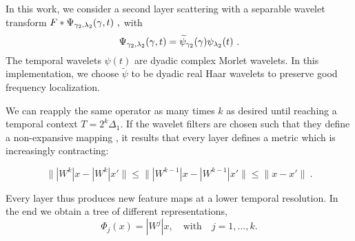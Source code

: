 In this work, we consider a second layer scattering with 
a separable wavelet transform $F \ast \Psi_{\gamma_2, {\lambda}_2} (\gamma, t)~,$
with
$$\Psi_{{\gamma_2}, {{\lambda}_2}}(\gamma,t) = \widetilde{\psi}_{\gamma_2}(\gamma) \psi_{{\lambda}_2}(t)~.$$
The temporal wavelets $\psi(t)$ are dyadic complex Morlet wavelets. 
In this implementation, 
we choose $\widetilde{\psi}$ to be dyadic real Haar wavelets to preserve good frequency localization.

We can reapply the same operator as many times $k$ as desired until reaching a temporal 
context $T = 2^k \Delta_1$. If the wavelet filters are chosen such that they define a non-expansive mapping \cite{pami}, it results that every layer defines a metric which is increasingly contracting:

$$\| |W^k| x - |W^k| x' \| \leq \| |W^{k-1}| x - |W^{k-1}| x' \| \leq \| x - x' \| ~.$$

Every layer thus produces new feature maps at a lower temporal resolution. 
In the end we obtain a tree of different representations,
$$\Phi_j(x) = |W^j| x, \quad \textrm{with} \quad j=1,\ldots, k.$$ 


%
%
%
%
%
%
%

%
%
%
%
%
%
